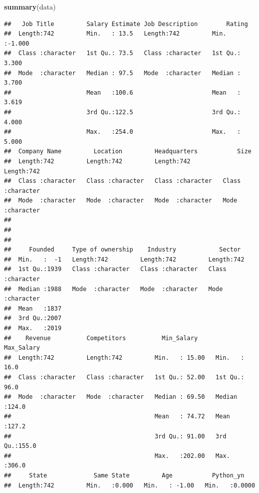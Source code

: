 \documentclass[
]{article}
\newenvironment{Shaded}{\begin{snugshade}}{\end{snugshade}}
\newcommand{\FunctionTok}[1]{\textcolor[rgb]{0.13,0.29,0.53}{\textbf{#1}}}
\newcommand{\NormalTok}[1]{#1}
\begin{document}
\begin{Shaded}
\begin{Highlighting}[]
\FunctionTok{summary}\NormalTok{(data)}
\end{Highlighting}
\end{Shaded}

\begin{verbatim}
##   Job Title         Salary Estimate Job Description        Rating      
##  Length:742         Min.   : 13.5   Length:742         Min.   :-1.000  
##  Class :character   1st Qu.: 73.5   Class :character   1st Qu.: 3.300  
##  Mode  :character   Median : 97.5   Mode  :character   Median : 3.700  
##                     Mean   :100.6                      Mean   : 3.619  
##                     3rd Qu.:122.5                      3rd Qu.: 4.000  
##                     Max.   :254.0                      Max.   : 5.000  
##  Company Name         Location         Headquarters           Size          
##  Length:742         Length:742         Length:742         Length:742        
##  Class :character   Class :character   Class :character   Class :character  
##  Mode  :character   Mode  :character   Mode  :character   Mode  :character  
##                                                                             
##                                                                             
##                                                                             
##     Founded     Type of ownership    Industry            Sector         
##  Min.   :  -1   Length:742         Length:742         Length:742        
##  1st Qu.:1939   Class :character   Class :character   Class :character  
##  Median :1988   Mode  :character   Mode  :character   Mode  :character  
##  Mean   :1837                                                           
##  3rd Qu.:2007                                                           
##  Max.   :2019                                                           
##    Revenue          Competitors          Min_Salary       Max_Salary   
##  Length:742         Length:742         Min.   : 15.00   Min.   : 16.0  
##  Class :character   Class :character   1st Qu.: 52.00   1st Qu.: 96.0  
##  Mode  :character   Mode  :character   Median : 69.50   Median :124.0  
##                                        Mean   : 74.72   Mean   :127.2  
##                                        3rd Qu.: 91.00   3rd Qu.:155.0  
##                                        Max.   :202.00   Max.   :306.0  
##     State             Same State         Age           Python_yn     
##  Length:742         Min.   :0.000   Min.   : -1.00   Min.   :0.0000  

\end{verbatim}
\end{document}
